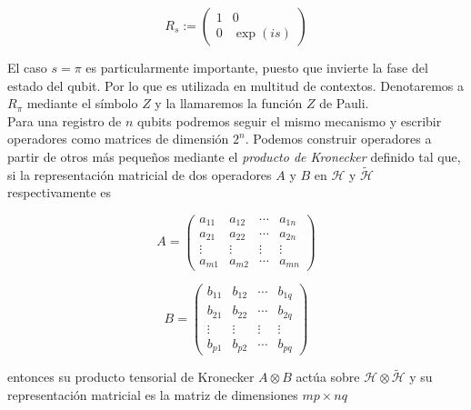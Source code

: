 \documentclass[11pt, spanish]{report}
\numberwithin{equation}{section}
\numberwithin{defin}{section}
\begin{document}
\begin{equation}
R_s:=\begin{pmatrix}
1 & 0 \\
0 & \exp(is)
\end{pmatrix}
\end{equation}

El caso $s=\pi$ es particularmente importante, puesto que invierte la fase del estado del qubit. Por lo que es utilizada en multitud de contextos. Denotaremos a $R_\pi$ mediante el símbolo $Z$ y la llamaremos la función $Z$ de Pauli.\\

Para una registro de $n$ qubits podremos seguir el mismo mecanismo y escribir operadores como matrices de dimensión $2^n$. Podemos construir operadores a partir de otros más pequeños mediante el \emph{producto de Kronecker} definido tal que, si la representación matricial de dos operadores $A$ y $B$ en $\mathcal{H}$ y $\tilde{\mathcal{H}}$ respectivamente es\\

\noindent\begin{minipage}{.5\linewidth}
\begin{equation*}
A=\begin{pmatrix}
a_{11} & a_{12} & \cdots & a_{1n} \\
a_{21} & a_{22} & \cdots & a_{2n} \\
\vdots & \vdots & \vdots & \vdots \\
a_{m1} & a_{m2} & \cdots & a_{mn}
\end{pmatrix}
\end{equation*}
\end{minipage}%
\begin{minipage}{.5\linewidth}
\begin{equation}
B=\begin{pmatrix}
b_{11} & b_{12} & \cdots & b_{1q} \\
b_{21} & b_{22} & \cdots & b_{2q} \\
\vdots & \vdots & \vdots & \vdots \\
b_{p1} & b_{p2} & \cdots & b_{pq}
\end{pmatrix}
\end{equation}
\end{minipage}
\vspace{0.3cm}

\noindent entonces su producto tensorial de Kronecker $A\otimes B$ actúa sobre $\mathcal{H}\otimes\tilde{\mathcal{H}}$ y su representación matricial\footnotemark{} es la matriz de dimensiones $mp\times nq$
\end{document}
